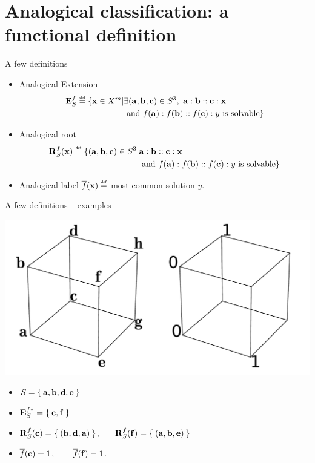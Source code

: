 \documentclass{beamer}
\begin{document}
\section[Analogical classification]{Analogical classification: a functional definition}

\begin{frame}{A few definitions}
  \begin{itemize}
    \item \alert{Analogical Extension}
        \begin{align*}
          \esf \eqdef \{ \mathbf{x} \in X^m |  &\exists
          (\mathbf{a},\mathbf{b},\mathbf{c}) \in S^3, ~ \mathbf{a} : \mathbf{b}
          :: \mathbf{c} : \mathbf{x}\\
          &\text{ and } f(\mathbf{a}) : f(\mathbf{b}) ::
          f(\mathbf{c}) : y \text{ is solvable}\}
        \end{align*}
      \item \alert{Analogical root}
      \begin{align*}
        \rsfx \eqdef \{(\mathbf{a}, \mathbf{b}, \mathbf{c}) \in S^3 |
        &\mathbf{a}:\mathbf{b}::\mathbf{c}:\mathbf{x}\\ &\text{ and }
        f(\mathbf{a}):f(\mathbf{b})::f(\mathbf{c}):y \text{ is solvable}\}
      \end{align*}

    \item \alert{Analogical label}
      $\albl{\mathbf{x}} \eqdef $ most common solution $y$.
  \end{itemize}
\end{frame}

\begin{frame}{A few definitions -- examples}
  \begin{center}
    \includegraphics[width=.7\textwidth]{figures/ae_example.pdf}
  \end{center}
  \begin{itemize}
    \item$S = \Set{\mathbf{a}, \mathbf{b}, \mathbf{d}, \mathbf{e}}$
    \item $\mathbf{E}_{S}^{f*} = \Set{\mathbf{c}, \mathbf{f}}$
    \item $\mathbf{R}_{S}^{f}(\mathbf{c}) = \Set{(\mathbf{b}, \mathbf{d},
      \mathbf{a})}$,~~~ $\mathbf{R}_{S}^{f}(\mathbf{f}) = \Set{(\mathbf{a}, \mathbf{b},
      \mathbf{e})}$
    \item $\overline{f}(\mathbf{c}) = 1$, ~~~ $\overline{f}(\mathbf{f}) = 1$.
  \end{itemize}
\end{frame}
\end{document}
